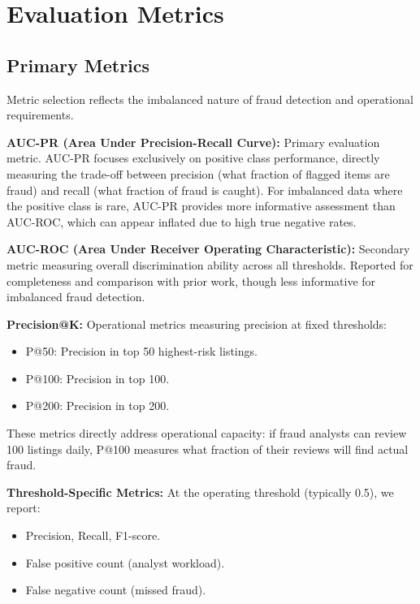 \section{Evaluation Metrics}
\label{sec:3_9}

\subsection{Primary Metrics}

Metric selection reflects the imbalanced nature of fraud detection and operational requirements.

\textbf{AUC-PR (Area Under Precision-Recall Curve):} Primary evaluation metric. AUC-PR focuses exclusively on positive class performance, directly measuring the trade-off between precision (what fraction of flagged items are fraud) and recall (what fraction of fraud is caught). For imbalanced data where the positive class is rare, AUC-PR provides more informative assessment than AUC-ROC, which can appear inflated due to high true negative rates.

\textbf{AUC-ROC (Area Under Receiver Operating Characteristic):} Secondary metric measuring overall discrimination ability across all thresholds. Reported for completeness and comparison with prior work, though less informative for imbalanced fraud detection.

\textbf{Precision@K:} Operational metrics measuring precision at fixed thresholds:
\begin{itemize}
    \item P@50: Precision in top 50 highest-risk listings.
    \item P@100: Precision in top 100.
    \item P@200: Precision in top 200.
\end{itemize}

These metrics directly address operational capacity: if fraud analysts can review 100 listings daily, P@100 measures what fraction of their reviews will find actual fraud.

\textbf{Threshold-Specific Metrics:} At the operating threshold (typically 0.5), we report:
\begin{itemize}
    \item Precision, Recall, F1-score.
    \item False positive count (analyst workload).
    \item False negative count (missed fraud).
\end{itemize}

